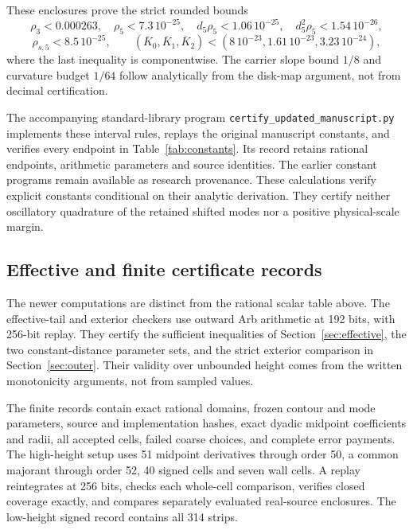 These enclosures prove the strict rounded bounds
\[
 \rho_3<0.000263,\quad \rho_5<7.3\,10^{-25},\quad
 d_5\rho_5<1.06\,10^{-25},\quad d_5^2\rho_5<1.54\,10^{-26},
\]
\[
 \rho_{s,5}<8.5\,10^{-25},\qquad
 (\overline K_0,\overline K_1,\overline K_2)
 <(8\,10^{-23},1.61\,10^{-23},3.23\,10^{-24}),
\]
where the last inequality is componentwise.
The carrier slope bound $1/8$ and curvature budget $1/64$ follow
analytically from the disk-map argument, not from decimal certification.

The accompanying standard-library program
\texttt{certify\_updated\_manuscript.py} implements these interval rules,
replays the original manuscript constants, and verifies every endpoint
in Table~\ref{tab:constants}. Its record retains rational endpoints,
arithmetic parameters and source identities. The earlier constant
programs remain available as research provenance.
These calculations verify explicit constants conditional on their
analytic derivation. They certify neither oscillatory quadrature of the
retained shifted modes nor a positive physical-scale margin.

\subsection{Effective and finite certificate records}

The newer computations are distinct from the rational scalar table above.
The effective-tail and exterior checkers use outward Arb arithmetic
at 192 bits, with 256-bit replay. They certify the sufficient inequalities
of Section~\ref{sec:effective}, the two constant-distance parameter sets,
and the strict exterior comparison in Section~\ref{sec:outer}.
Their validity over unbounded height comes from the written monotonicity
arguments, not from sampled values.

The finite records contain exact rational domains, frozen contour and
mode parameters, source and implementation hashes, exact dyadic midpoint
coefficients and radii, all accepted cells, failed coarse choices,
and complete error payments. The high-height setup uses 51 midpoint
derivatives through order 50, a common majorant through order 52,
40 signed cells and seven wall cells. A replay reintegrates at 256 bits,
checks each whole-cell comparison, verifies closed coverage exactly,
and compares separately evaluated real-source enclosures.
The low-height signed record contains all 314 strips.

